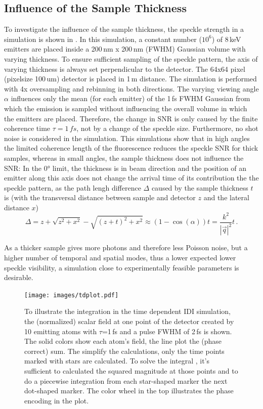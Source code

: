 \subsection{Influence of the Sample Thickness}
To investigate the influence of the sample thickness, the speckle strength in a simulation is shown in . In this simulation, a constant number ($10^6$) of 8\,keV emitters are placed inside a 200\,nm x 200\,nm (FWHM) Gaussian volume with varying thickness. To ensure sufficient sampling of the speckle pattern, the axis of varying thickness is always set perpendicular to the detector. The 64x64 pixel (pixelsize 100\,um) detector is placed in 1\,m distance. The simulation is performed with 4x oversampling and rebinning in both directions. The varying viewing angle $\alpha$ influences only the mean (for each emitter) of the 1\,fs FWHM Gaussian from which the emission is sampled without influencing the overall volume in which the emitters are placed. Therefore, the change in SNR is only caused by the finite coherence time $\tau=1\,fs$, not by a change of the speckle size. Furthermore, no shot noise is considered in the simulation.
This simulations show that in high angles the limited coherence length of the fluorescence reduces the speckle SNR for thick samples, whereas in small angles, the sample thickness does not influence the SNR: In the 0° limit, the thickness is in beam direction and the position of an emitter along this axis does not change the arrival time of its contribution the the speckle pattern, as the path lengh difference $\Delta$ caused by the sample thickness $t$ is (with the transversal distance between sample and detector $z$ and the lateral distance $x$)
\begin{equation}
	\Delta=z+\sqrt{z^2+x^2}-\sqrt{(z+t)^2+x^2} \approx(1-\cos (\alpha)) t=\frac{k^2}{\left|\vec{q}\right|^2}t \,.
\end{equation}



 As a thicker sample gives more photons and therefore less Poisson noise, but a higher number of temporal and spatial modes, thus a lower expected lower speckle visibility, a simulation close to experimentally feasible parameters is desirable.







\begin{figure}
	   \centering
		\texttt{[image: images/tdplot.pdf]}
	\caption[Integration in Time Dependent IDI Simulation]{To illustrate the integration in the time dependent IDI simulation, the (normalized) scalar field at one point of the detector created by 10 emitting atoms with $\tau$=1\,fs and a pulse FWHM of 2\,fs is shown. The solid colors show each atom's field, the line plot the (phase correct) sum. The simplify the calculations, only the time points marked with stars are calculated. To solve the integral , it's sufficient to calculated the squared magnitude at those points and to do a piecewise integration from each star-shaped marker the next dot-shaped marker. The color wheel in the top illustrates the phase encoding in the plot.}
	\label{fig:tdplot}
\end{figure}



